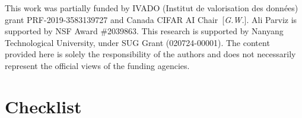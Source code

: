 \documentclass{article}
\begin{document}
\begin{ack}
This work was partially funded by IVADO (Institut de valorisation des données) grant PRF-2019-3583139727 and Canada CIFAR AI Chair~[\emph{G.W.}]. Ali Parviz is supported by NSF
Award \#2039863. This research is supported by Nanyang Technological University, under SUG Grant (020724-00001). The content provided here is solely the responsibility of the authors and does not necessarily represent the official views of the funding agencies.
\end{ack}





\newpage
\section*{Checklist}
\end{document}
